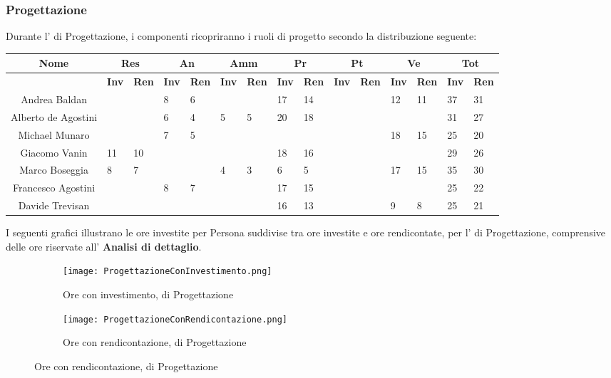 \documentclass{scalatekids-article}
\begin{document}
\subsubsection{Progettazione}
Durante l' di Progettazione, i componenti ricopriranno i ruoli di progetto secondo la distribuzione seguente:
\begin{center}
  \scriptsize
  \begin{tabular}{| c | p{0.35cm}  p{0.35cm} | p{0.35cm}  p{0.35cm} | p{0.35cm}  p{0.35cm} | p{0.35cm}  p{0.35cm} | p{0.35cm}  p{0.35cm} | p{0.35cm}  p{0.35cm} | p{0.35cm}  p{0.35cm} |}
    \hline
    \textbf{Nome} & \multicolumn{2}{|c|}{\textbf{Res}} & \multicolumn{2}{|c|}{\textbf{An}} & \multicolumn{2}{|c|}{\textbf{Amm}} & \multicolumn{2}{|c|}{\textbf{Pr}} & \multicolumn{2}{|c|}{\textbf{Pt}} & \multicolumn{2}{|c|}{\textbf{Ve}} & \multicolumn{2}{|c|}{\textbf{Tot}}\\
    \hline
    & \textbf{Inv} & \textbf{Ren} & \textbf{Inv} & \textbf{Ren} & \textbf{Inv} & \textbf{Ren} & \textbf{Inv} & \textbf{Ren} & \textbf{Inv} & \textbf{Ren} & \textbf{Inv} & \textbf{Ren} & \textbf{Inv} & \textbf{Ren}\\
    \hline
    Andrea Baldan & & & 8 & 6 & & & 17 & 14 & & & 12 & 11 & 37 & 31\\
    Alberto de Agostini & & & 6 & 4 & 5 & 5 & 20 & 18 & & & & & 31 & 27\\
    Michael Munaro & & & 7 & 5 & & & & & & & 18 & 15 & 25 & 20\\
    Giacomo Vanin & 11 & 10 & & & & & 18 & 16 & & & & & 29 & 26\\
    Marco Boseggia & 8 & 7 & & & 4 & 3 & 6 & 5 & & & 17 & 15 & 35 & 30\\
    Francesco Agostini & & & 8 & 7 & & & 17 & 15 & & & & & 25 & 22\\
    Davide Trevisan & & & & & & & 16 & 13 & & & 9 & 8 & 25 & 21\\
    \hline
  \end{tabular}
\end{center}
I seguenti grafici illustrano le ore investite per Persona suddivise tra ore
investite e ore rendicontate, per l' di Progettazione, comprensive delle
ore riservate all' \textbf{Analisi di dettaglio}.
\begin{figure}[H]
  \begin{subfigure}[H]{0.47\textwidth}
    \texttt{[image: ProgettazioneConInvestimento.png]}
    \caption*{Ore con investimento,  di Progettazione}
  \end{subfigure}
  \qquad
  \begin{subfigure}[H]{0.47\textwidth}
    \texttt{[image: ProgettazioneConRendicontazione.png]}
    \caption*{Ore con rendicontazione,  di Progettazione}
  \end{subfigure}
\end{figure}
\end{document}
